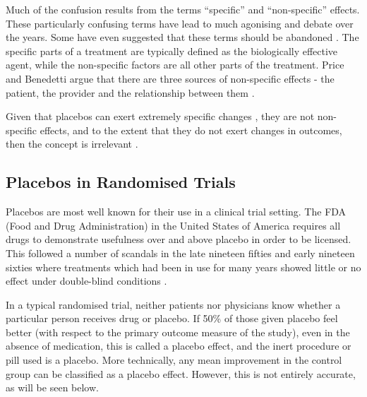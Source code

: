Much of the confusion results from the terms ``specific'' and ``non-specific'' effects. These particularly confusing terms have lead to much agonising and debate over the years. Some have even suggested that these terms should be abandoned \cite{Caspi2002}. The specific parts of a treatment are typically defined as the biologically effective agent, while the non-specific factors are all other parts of the treatment. Price and Benedetti argue that there are three sources of non-specific effects - the patient, the provider and the relationship between them \cite{Price2008}.  

Given that placebos can exert extremely specific changes \cite{Amanzio2001,Caspi2002}, they are not non-specific effects, and to the extent that they do not exert changes in outcomes, then the concept is irrelevant \cite{Moerman2003}.  

\subsection{Placebos in Randomised Trials}
\label{sec:plac-rand-trials}

Placebos are most well known for their use in a clinical trial setting. The FDA (Food and Drug Administration) in the United States of America  requires all drugs to demonstrate usefulness over and above placebo in order to be licensed. This followed a number of scandals in the late nineteen fifties and early nineteen sixties where treatments which had been in use for many years showed little or no effect under double-blind conditions \cite{Moerman2000a}. 

In a typical randomised trial, neither patients nor physicians know whether a particular person receives drug or placebo.  If 50\% of those given placebo feel  better (with respect to the primary outcome measure of the study), even in the absence of medication, this is called a placebo effect, and the inert procedure or pill used is a placebo. More technically, any mean improvement in the control group can be classified as a placebo effect. However, this is not entirely accurate, as will be seen below.   


